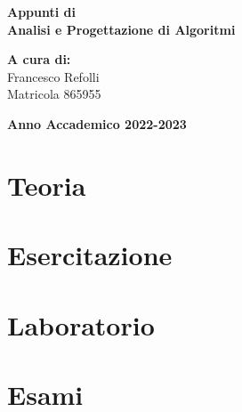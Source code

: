 \documentclass[a4paper,12pt,oneside]{book}
\begin{document}
    
    \begin{titlepage}
        
	\vspace{40mm}
        
	\begin{center}
            {\LARGE{
                    \textbf{Appunti di \\ Analisi e Progettazione di Algoritmi}
                    \par
            }}
        \end{center}
        
        \vspace{50mm}

        \begin{flushright}
            {\large \textbf{A cura di:}} \\
            \large{Francesco Refolli} \\
            \large{Matricola 865955} 
        \end{flushright}
        
        \vspace{40mm}
        \begin{center}
            {\large{\bf Anno Accademico 2022-2023}}
        \end{center}

        \restoregeometry
        
    \end{titlepage}
    
    \printindex
    
    
    \part{Teoria}
    
    
    
    
    
    
    \part{Esercitazione}
    
    
    
    
    
    
    
    \part{Laboratorio}
    
    
    

    \part{Esami}
    
\end{document}
